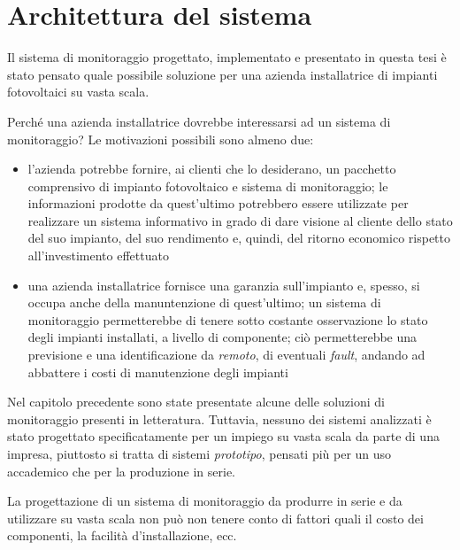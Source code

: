 \clearpage{\pagestyle{empty}\cleardoublepage}
\chapter{Architettura del sistema}
%
Il sistema di monitoraggio progettato, implementato e presentato in questa tesi \`e 
stato pensato quale possibile soluzione per una azienda installatrice di impianti fotovoltaici 
su vasta scala.
%

%
Perch\'e una azienda installatrice dovrebbe interessarsi ad un sistema 
di monitoraggio? Le motivazioni possibili sono almeno due:
%
\begin{itemize}
\item l'azienda potrebbe fornire, ai clienti che lo desiderano, un pacchetto 
      comprensivo di impianto fotovoltaico e sistema di monitoraggio; le 
      informazioni prodotte da quest'ultimo potrebbero essere utilizzate 
      per realizzare un sistema informativo in grado di dare visione 
      al cliente  dello stato del suo impianto,  del 
      suo rendimento e, quindi,  del ritorno economico 
      rispetto all'investimento effettuato
%
\item una azienda installatrice fornisce una garanzia sull'impianto e, spesso, 
      si occupa anche della manuntenzione di quest'ultimo; un sistema di 
      monitoraggio permetterebbe di tenere sotto costante osservazione 
      lo stato degli impianti installati, a livello di componente; ci\`o
      permetterebbe una previsione e una identificazione da \emph{remoto}, di 
      eventuali \emph{fault}, andando ad abbattere i costi di manutenzione
      degli impianti
\end{itemize}
%

%
Nel capitolo precedente sono state presentate alcune delle soluzioni di 
monitoraggio presenti in letteratura. Tuttavia, nessuno dei sistemi analizzati 
\`e stato progettato specificatamente per un impiego su vasta scala da parte di una impresa, 
piuttosto si tratta di sistemi \emph{prototipo}, pensati pi\`u per un uso 
accademico che per la produzione in serie.
%

La progettazione di un sistema di monitoraggio da produrre in serie e da utilizzare su 
vasta scala non pu\`o non tenere conto di fattori quali il costo dei 
componenti, la facilit\`a d'installazione, ecc.
%

